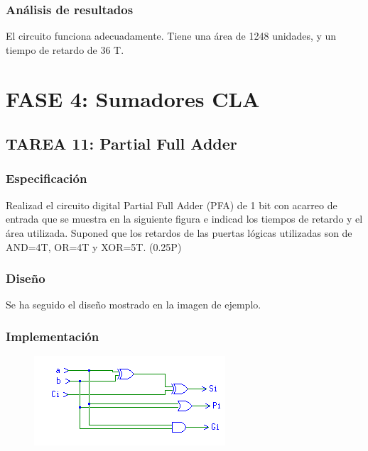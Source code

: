 \documentclass{article}
\begin{document}
		\subsubsection*{Análisis de resultados}
		El circuito funciona adecuadamente. Tiene una área de 1248 unidades, y un tiempo de retardo de 36 T.

\section{FASE 4: Sumadores CLA}
	\subsection{TAREA 11: Partial Full Adder}
		\subsubsection*{Especificación}
		Realizad el circuito digital Partial Full Adder (PFA) de 1 bit con acarreo de entrada
		que se muestra en la siguiente figura e indicad los tiempos de retardo y el área utilizada. Suponed
		que los retardos de las puertas lógicas utilizadas son de AND=4T, OR=4T y XOR=5T. (0.25P)


		\subsubsection*{Diseño}
		Se ha seguido el diseño mostrado en la imagen de ejemplo.

		\subsubsection*{Implementación}
		 \begin{figure}[ht]
			\includegraphics[width=0.8\linewidth]{PFA}
		 	\centering
		 \end{figure}
\end{document}
